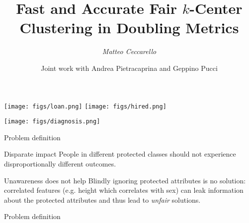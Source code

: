 \documentclass{beamer}
\title{Fast and Accurate Fair $k$-Center Clustering in Doubling Metrics}
\author{\emph{Matteo Ceccarello}}
\institute{U. of Padova}
\date{Joint work with Andrea Pietracaprina and Geppino Pucci}
\begin{document}
\frame{\titlepage}

%


\begin{frame}{}
	\centering

  \texttt{[image: figs/loan.png]}
  \texttt{[image: figs/hired.png]}

  \texttt{[image: figs/diagnosis.png]}

\end{frame}

\begin{frame}{Problem definition}
	\begin{block}{Disparate impact}
    People in different protected
		classes should not experience disproportionally different outcomes.
	\end{block}

	\pause

	\begin{block}{Unawareness does not help}
		Blindly ignoring protected attributes
		is no solution: correlated features (e.g. height which correlates with
		sex) can leak information about the protected attributes and thus lead to
		\emph{unfair} solutions.
	\end{block}
\end{frame}

\begin{frame}{Problem definition}
	\centering


\end{frame}
\end{document}
